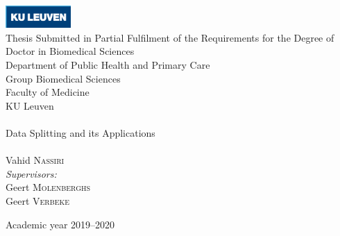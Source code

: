 \begin{titlepage}
\begin{center}

\includegraphics[width=2.5cm]{KULeuvenlogo.eps}\\[0.3cm]
Thesis Submitted in Partial Fulfilment of the Requirements for the
Degree of Doctor in Biomedical Sciences\\[0.5cm]
Department of Public Health and Primary Care\\
Group Biomedical Sciences\\
Faculty of Medicine\\
KU Leuven \\[0.7cm]

\HRule \\[0.4cm]
{ \huge  Data Splitting and its Applications}\\[0.4cm]

\HRule \\[0.5cm]


{\Large Vahid \textsc{Nassiri}}\\[0.5cm]
\emph{Supervisors:} \\[0.2cm]
{\large Geert \textsc{Molenberghs}}\\
{\large Geert \textsc{Verbeke}}


\vfill

{\large Academic year 2019--2020}

\end{center}
\end{titlepage}
